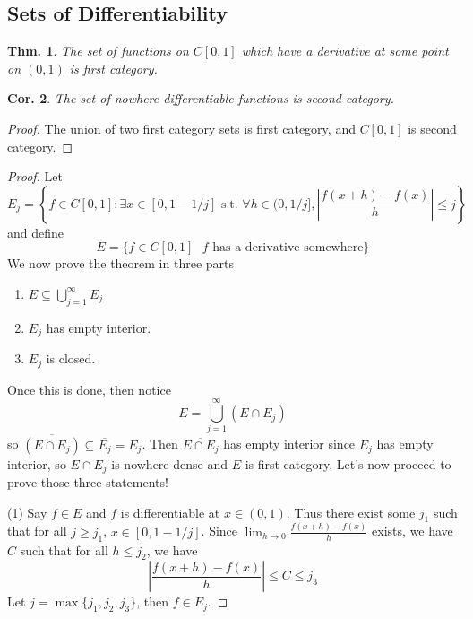 \documentclass[12pt, a4paper]{book}
\newtheorem{theorem}{Thm.}[section]
\newtheorem{corollary}[theorem]{Cor.}
\theoremstyle{nonumberplain}
\newtheorem{proof}{Proof}
\begin{document}
\subsection{Sets of Differentiability}
\begin{theorem}
    The set of functions on $C[0,1]$ which have a derivative at some point on $(0,1)$ is first category.
\end{theorem}
\begin{corollary}
    The set of nowhere differentiable functions is second category.
\end{corollary}
\begin{proof}
    The union of two first category sets is first category, and $C[0,1]$ is second category.
\end{proof}
\begin{proof}
    Let
    \[E_j = \left\{f\in C[0,1]:\exists x\in[0,1-1/j]\text{ s.t. }\forall h\in(0,1/j],\left\lvert\frac{f(x+h)-f(x)}{h}\right\rvert\leq j\right\}\]
    and define
    \[E=\{f\in C[0,1]\text{ $f$ has a derivative somewhere}\}\]
    We now prove the theorem in three parts
    \begin{enumerate}
        \item $E\subseteq\bigcup_{j=1}^\infty E_j$
        \item $E_j$ has empty interior.
        \item $E_j$ is closed.
    \end{enumerate}
    Once this is done, then notice
    \[E=\bigcup\limits_{j=1}^\infty (E\cap E_j)\]
    so $\overline{(E\cap E_j)}\subseteq\overline{E_j}=E_j$.
    Then $\overline{E\cap E_j}$ has empty interior since $E_j$ has empty interior, so $E\cap E_j$ is nowhere dense and $E$ is first category.
    Let's now proceed to prove those three statements!

    (1) Say $f\in E$ and $f$ is differentiable at $x\in(0,1)$.
    Thus there exist some $j_1$ such that for all $j\geq j_1$, $x\in[0,1-1/j]$.
    Since $\lim_{h\to 0}\frac{f(x+h)-f(x)}{h}$ exists, we have $C$ such that for all $h\leq j_2$, we have
    \[\left\lvert\frac{f(x+h)-f(x)}{h}\right\rvert\leq C\leq j_3\]
    Let $j=\max\{j_1,j_2,j_3\}$, then $f\in E_j$.


\end{proof}
\end{document}
